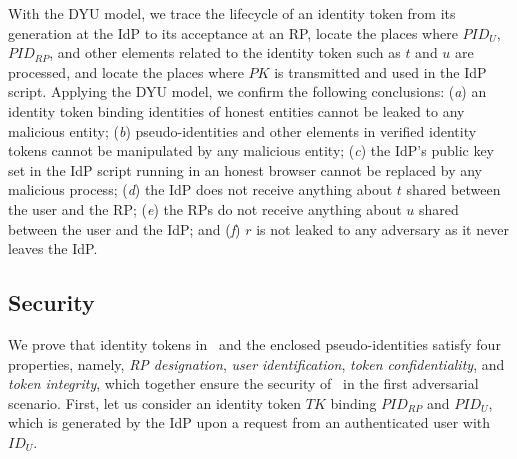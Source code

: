 With the DYU model, we trace the lifecycle of an identity token from its generation at the IdP to its acceptance at an RP, locate the places where $PID_U$, $PID_{RP}$, and other elements related to the identity token such as $t$ and $u$ are processed, and locate the places where $PK$ is transmitted and used in the IdP script.
Applying the DYU model, we confirm the following conclusions: 
(\emph{a}) an identity token binding identities of honest entities cannot be leaked to any malicious entity; 
(\emph{b}) pseudo-identities and other elements in verified identity tokens cannot be manipulated by any malicious entity; 
(\emph{c}) the IdP's public key set in the IdP script running in an honest browser cannot be replaced by any malicious process; 
(\emph{d}) the IdP does not receive anything about $t$ shared between the user and the RP; 
(\emph{e}) the RPs do not receive anything about $u$ shared between the user and the IdP; 
and (\emph{f}) $r$ is not leaked to any adversary as it never leaves the IdP.



\subsection{Security}
\label{analysis-security}


We prove that identity tokens in \usso~and the enclosed pseudo-identities satisfy four properties, namely, \emph{RP designation}, \emph{user identification}, \emph{token confidentiality}, and \emph{token integrity}, which together ensure the security of \usso~in the first adversarial scenario.
First, let us consider an identity token $TK$ binding $PID_{RP}$ and $PID_U$, which is generated by the IdP upon a request from an authenticated user with $ID_U$.


